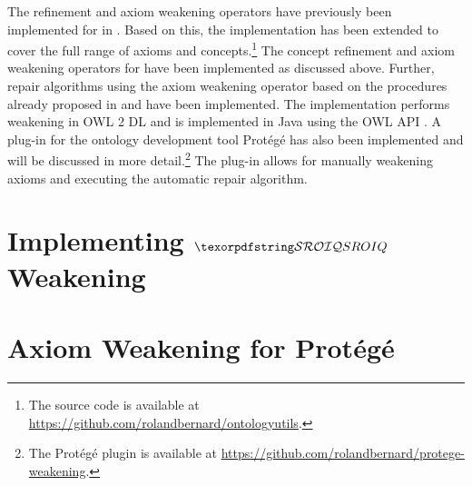 
The refinement and axiom weakening operators have previously been implemented for \ALC in \cite{troquard2018repairing}. Based on this, the implementation has been extended to cover the full range of \SROIQ axioms and concepts.\footnote{The source code is available at \url{https://github.com/rolandbernard/ontologyutils}.} The concept refinement and axiom weakening operators for \SROIQ have been implemented as discussed above. Further, repair algorithms using the axiom weakening operator based on the procedures already proposed in \cite{troquard2018repairing} and \cite{confalonieri2020towards} have been implemented. The implementation performs weakening in OWL 2 DL \cite{motik2012ontology} and is implemented in Java using the OWL API \cite{horridge2011owl,owlapi,matentzoglu2016introduction}. A plug-in for the ontology development tool Protégé has also been implemented and will be discussed in more detail.\footnote{The Protégé plugin is available at \url{https://github.com/rolandbernard/protege-weakening}.} The plug-in allows for manually weakening axioms and executing the automatic repair algorithm.

\section{Implementing \texorpdfstring{$\SROIQ$}{SROIQ} Weakening}\label{prototype}



\section{Axiom Weakening for Protégé}\label{protege}


